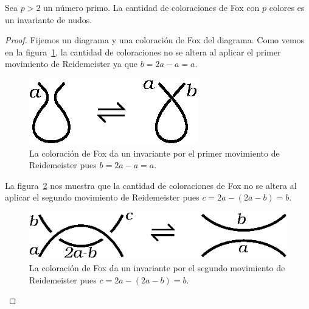 \documentclass[graybox]{svmult}
\begin{document}
\begin{theorem}
    \label{theorem:fox}
    Sea $p>2$ un número primo.  La cantidad de coloraciones de Fox con $p$ colores es
    un invariante de nudos. 

    \begin{proof}
        Fijemos un diagrama y una coloración de Fox del diagrama. Como vemos en la
        figura~\ref{fig:coloringR1}, la cantidad de coloraciones no se altera al aplicar el
        primer movimiento de Reidemeister ya que $b=2a-a=a$. 

        \begin{figure}[ht]
			\centering
	    	\includegraphics[scale=0.6]{images/coloringR1}
            \caption{La coloración de Fox da un invariante por el primer movimiento
            de Reidemeister pues $b=2a-a=a$.}
            \label{fig:coloringR1}
        \end{figure}

		La figura~\ref{fig:coloringR2} nos muestra que la cantidad de coloraciones de Fox 
		no se altera al aplicar el segundo movimiento de Reidemeister pues
		$c=2a-(2a-b)=b$.
        \begin{figure}[ht]
			\centering
	    	\includegraphics[scale=0.6]{images/coloringR2}
            \caption{La coloración de Fox da un invariante por el segundo movimiento
            de Reidemeister pues $c=2a-(2a-b)=b$.}
            \label{fig:coloringR2}
        \end{figure}



\end{proof}
\end{theorem}
\end{document}
